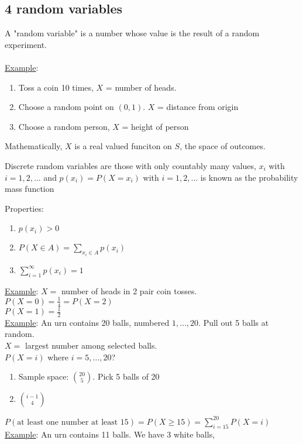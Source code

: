   \subsection*{4 random variables}
    A "random variable" is a number whose value is the result of a random 
    experiment.\\\\
  \underline{Example}: 
  \begin{enumerate}
    \item Toss a coin 10 times, $X$ = number of heads.
    \item Choose a random point on $(0,1)$. $X$ = distance from origin
    \item Choose a random person, $X$ = height of person
  \end{enumerate}
  Mathematically, $X$ is a real valued funciton on $S$, the space of outcomes.\\
  \begin{definition}
    Discrete random variables are those with only countably many values, $x_i$
    with $i = 1, 2, \ldots$ and $p(x_i) = P(X = x_i)$ with $i = 1, 2, \ldots$ is
    known as the probability mass function
  \end{definition}
  Properties:
  \begin{enumerate}
    \item $p(x_i) > 0$
    \item $P(X \in A) = \sum_{x_i \in A} p(x_i)$
    \item $\sum_{i = 1}^{\infty} p(x_i) = 1$
  \end{enumerate}
  \underline{Example}: $X =$ number of heads in 2 pair coin tosses.\\
    $P(X = 0) = \frac{1}{4} = P(X = 2)$\\
    $P(X = 1) = \frac{1}{2}$\\
  \underline{Example}: An urn contains 20 balls, numbered $1, \ldots, 20$.
    Pull out 5 balls at random.\\
    $X = $ largest number among selected balls.\\
    $P(X = i)$ where $i= 5, \ldots, 20$?\\
  \begin{enumerate}
    \item Sample space: $\binom{20}{5}$. Pick 5 balls of 20
    \item $\binom{i -1}{4}$
  \end{enumerate}
    $P(\text{at least one number at least 15}) = P(X \ge 15) = \sum_{i = 15}
    ^{20} P(X = i)$
  \underline{Example}: An urn contains 11 balls. We have 3 white balls,
